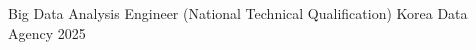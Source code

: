

\begin{cvhonors}

  \cvhonor
    {Big Data Analysis Engineer (National Technical Qualification)} %
    {Korea Data Agency} %
    {} %
    {2025} %

\end{cvhonors}
